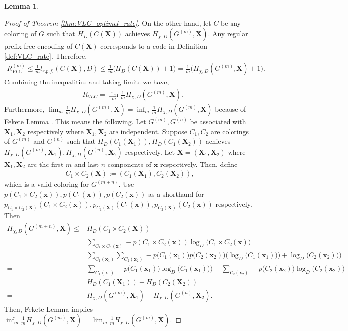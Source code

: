\documentclass[journal, onecolumn, draftcls]{IEEEtran}
\theoremstyle{definition}
\newtheorem{lemma}{Lemma}
\newcommand{\bfX}{\mathbf{X}}
\newcommand{\bfx}{\mathbf{x}}
\newcommand{\aditya}[1]{\marginpar{+}{\bf Aditya's remark}: {\em #1}}
\begin{document}
\begin{lemma}
\begin{proof}[Proof of Theorem \ref{thm:VLC_optimal_rate}]
On the other hand, let $C$ be any coloring of $G$ such that $H_D(C(\bfX))$ achieves $H_{\chi,D}(G^{(m)},\bfX)$. Any regular prefix-free encoding of   $C(\bfX)$ corresponds to a  code in Definition \ref{def:VLC_rate}. Therefore, 
    \begin{align*}
        R^{(m)}_{VLC}\le  \frac{1}{m}l_{r.p.f.}(C(\bfX),D)\le \frac{1}{m}\big ( H_{ D}(C(\bfX))+1\big ) = \frac{1}{m}\big ( H_{\chi,D}(G^{(m)},\bfX)+1\big ).
    \end{align*}
Combining the inequalities and taking limits we have,
\begin{align*}
  &R_{VLC}  =\lim_m \frac{1}{m} H_{\chi,D}(G^{(m)},\bfX).
\end{align*}
Furthermore, $\lim_m\frac{1}{m} H_{\chi,D}(G^{(m)},\bfX) = \inf_m\frac{1}{m} H_{\chi,D}(G^{(m)},\bfX)$ because of Fekete Lemma \cite{Fekete_23}. This means the following. Let $G^{(m)},G^{(n)}$ be associated with $\bfX_1,\bfX_2$ respectively where $\bfX_1,\bfX_2$ are independent. Suppose $C_1,C_2$ are colorings of $G^{(m)}$ and $G^{(n)}$  such that $H_D(C_1(\bfX_1)),H_D(C_1(\bfX_2))$ achieves $H_{\chi,D}(G^{(m)},\bfX_1),H_{\chi,D}(G^{(n)},\bfX_2)$  respectively. Let $\bfX=(\bfX_1,\bfX_2)$ where $\bfX_1,\bfX_2$ are the first $m$ and last $n$ components of $\bfx$ respectively. Then, define
\begin{align*}
    C_1\times C_2(\bfX) := (C_1(\bfX_1),C_2(\bfX_2)),
\end{align*}
which is a valid coloring for $G^{(m+n)}$. %
Use $p(C_1\times C_2(\bfx)),p(C_1(\bfx)), p(C_2(\bfx))$ as a shorthand for $p_{C_1\times C_2(\bfX)}(C_1\times C_2(\bfx)),p_{C_1(\bfX)}(C_1(\bfx)), p_{C_2(\bfX)}(C_2(\bfx))$ respectively. Then 
\begin{align*}  
    H_{\chi, D}(G^{(m+n)},\bfX )\le&  H_D(C_1\times C_2(\bfX)) \\
    =&\sum_{C_1\times C_2(\bfx)} -p(C_1\times C_2(\bfx))\log_D \big( C_1\times C_2(\bfx) \big)\\
    =&\sum_{C_1(\bfx_1)}\sum_{C_2(\bfx_2)} -p\big (C_1(\bfx_1)\big )p\big ( C_2(\bfx_2)\big )\Big (\log_D \big( C_1 (\bfx_1) )\big)+\log_D \big( C_2(\bfx_2) \big)\Big )\\
    =&\sum_{C_1(\bfx_1)}-p\big (C_1(\bfx_1)\big ) \log_D \big( C_1( \bfx_1) )\big) +  \sum_{C_2(\bfx_2)} - p\big ( C_2(\bfx_2)\big ) \log_D \big( C_2(\bfx_2) \big) \\
    =& H_D(C_1(\bfX_1)) + H_D(C_2(\bfX_2))\\ 
    =&H_{\chi,D}(G^{(m)},\bfX_1)+H_{\chi,D}(G^{(n)},\bfX_2). 
\end{align*}
Then, Fekete Lemma implies $\inf_m\frac{1}{m} H_{\chi,D}(G^{(m)},\bfX)=\lim_m\frac{1}{m} H_{\chi,D}(G^{(m)},\bfX)$.
\end{proof}
\end{lemma}  
\end{document}
